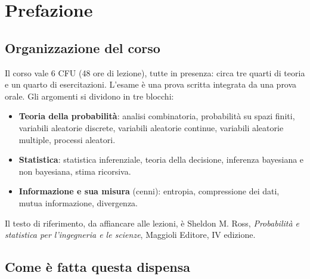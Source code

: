 \chapter{Prefazione}

\pagestyle{plain}

\section{Organizzazione del corso}

Il corso vale 6 CFU (48 ore di lezione), tutte in presenza: circa tre quarti di teoria e un quarto di esercitazioni.
L'esame è una prova scritta integrata da una prova orale. Gli argomenti si dividono in tre blocchi:
\begin{itemize}
  \item \textbf{Teoria della probabilità}: analisi combinatoria, probabilità su spazi finiti, variabili aleatorie
        discrete, variabili aleatorie continue, variabili aleatorie multiple, processi aleatori.
  \item \textbf{Statistica}: statistica inferenziale, teoria della decisione, inferenza bayesiana e non bayesiana,
        stima ricorsiva.
  \item \textbf{Informazione e sua misura} (cenni): entropia, compressione dei dati, mutua informazione, divergenza.
\end{itemize}
Il testo di riferimento, da affiancare alle lezioni, è Sheldon M. Ross, \emph{Probabilità e statistica per
l'ingegneria e le scienze}, Maggioli Editore, IV edizione.

\section{Come è fatta questa dispensa}

